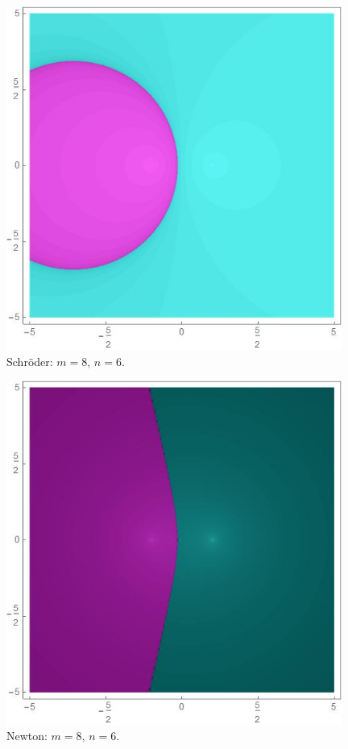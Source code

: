 \begin{figure}[H]
\vspace{0.5cm}

\begin{minipage}[t]{0.45\textwidth}
\centering
\includegraphics[width=0.98\textwidth]{fuentes/articulo-cuadraticos/imagenes/sch_m_8n_6.jpg}
\small Schröder: $m=8, \, n=6.$
\end{minipage}\hfill
\begin{minipage}[t]{0.45\textwidth}
\centering
\includegraphics[width=0.98\textwidth]{fuentes/articulo-cuadraticos/imagenes/newton_m_8n_6.jpg}
\small Newton: $m=8, \, n=6.$
\end{minipage}


\end{figure}
